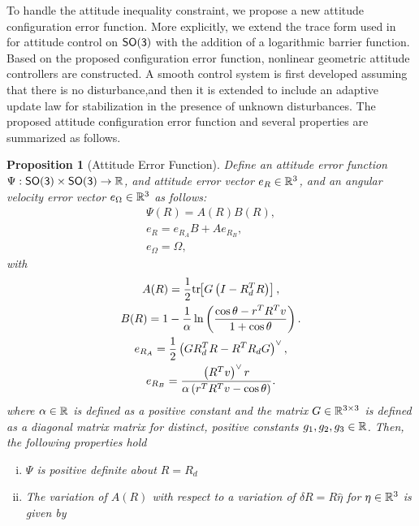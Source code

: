 \documentclass[letterpaper, 10 pt, conference]{ieeeconf}  %
\newtheorem{prop}{Proposition}
\begin{document}
To handle the attitude inequality constraint, we propose a new attitude configuration error function. More explicitly, we extend the trace form used in~\cite{bullo2004,LeeITCST13} for attitude control on \(\mathsf{SO(3)}\) with the addition of a logarithmic barrier function. Based on the proposed configuration error function,  nonlinear geometric attitude controllers are constructed. A smooth control system is first developed assuming that there is  no disturbance,and then it is extended to include an adaptive update law for stabilization in the presence of unknown disturbances. The proposed attitude configuration error function and several properties are summarized as follows.

\begin{prop}[Attitude Error Function] \label{prop:config_error}
Define an attitude error function \( \Psi : \mathsf{SO(3)} \times \mathsf{SO(3)} \to \mathbb{R} \), and attitude error vector \( e_R \in \mathbb{R}^3 \), and an angular velocity error vector \( e_\Omega \in \mathbb{R}^3 \) as follows:
\begin{gather}
	\Psi(R) = A(R) B(R) , \label{eqn:psi} \\
	e_R = e_{R_A} B + A e_{R_B} , \label{eqn:eR} \\
	e_\Omega = \Omega , \label{eqn:eW}
\end{gather}
with
\begin{gather}
	A(R) = \frac{1}{2} \mathrm{tr}\negthickspace\left[ G \left( I - R_d^T R\right) \right] , \label{eqn:A} \\
	B(R) = 1 - \frac{1}{\alpha} \ln \left( \frac{\cos \theta -  r^T R^T v}{1 + \cos \theta}\right) . \label{eqn:B} \\
	e_{R_A} = \frac{1}{2} \left( G R_d^T R - R^T R_d G \right) ^ \vee , \label{eqn:eRA} \\
	e_{R_B} = \frac{ \left( R^T v\right)^\vee r}{\alpha \left(r^T R^T v - \cos \theta \right)} . \label{eqn:eRB} 
\end{gather}	
where \( \alpha \in \mathbb{R} \) is defined as a positive constant and the matrix \( G \in \mathbb{R}^{3 \times 3} \) is defined as a diagonal matrix matrix for distinct, positive constants \( g_1, g_2, g_3 \in \mathbb{R} \).
Then, the following properties hold
\begin{enumerate}[(i)]
	\item \label{item:prop_psi_psd} \(\Psi\) is positive definite about \( R = R_d\)
	\item \label{item:prop_era}The variation of \( A(R) \) with respect to a variation of \( \delta R = R \hat{\eta} \) for \( \eta \in \mathbb{R}^3 \) is given by

\end{enumerate}
\end{prop}
\end{document}
